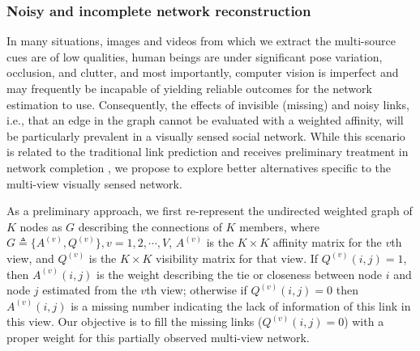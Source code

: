 \subsubsection{Noisy and incomplete network reconstruction}
\label{sec:reconstruct}

In many situations, images and videos from which we extract the multi-source cues are of low qualities, human beings are under significant pose variation, occlusion, and clutter, and most importantly, computer vision is imperfect and may frequently be incapable of yielding reliable outcomes for the network estimation to use. Consequently, the effects of invisible (missing) and noisy links, i.e., that an edge in the graph cannot be evaluated with a weighted affinity, will be particularly prevalent in a visually sensed social network. While this scenario is related to the traditional link prediction \cite{Goldberg,Liben-Nowell,TaskarWAK03} and receives preliminary treatment in network completion \cite{Clauset,Guimera,HannekeX09,KimL11}, we propose to explore better alternatives specific to the multi-view visually sensed network.

As a preliminary approach, we first re-represent the undirected weighted graph of $K$ nodes as $G$ describing the connections of $K$ members, where $G\triangleq\{A^{(v)}, Q^{(v)}\}, v=1,2,\cdots,V$, $A^{(v)}$ is the $K\times K$ affinity matrix for the $v$th view, and $Q^{(v)}$ is the $K\times K$ visibility matrix for that view. If $Q^{(v)}(i,j)=1$, then $A^{(v)}(i,j)$ is the weight describing the tie or closeness between node $i$ and node $j$ estimated from the $v$th view; otherwise if $Q^{(v)}(i,j)=0$ then $A^{(v)}(i,j)$ is a missing number indicating the lack of information of this link in this view. Our objective is to fill the missing links ($Q^{(v)}(i,j)=0$) with a proper weight for this partially observed multi-view network. 


